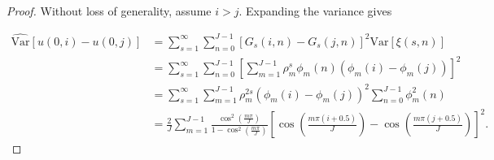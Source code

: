 \documentclass[12pt]{amsart}
\numberwithin{equation}{section}
\newcommand{\1}{\mathbf{1}}
\begin{document}
\begin{proof}
Without loss of generality, assume $i>j$. Expanding the variance gives

\begin{equation}
\begin{split}
\label{var}
    \widehat{\text{Var}}[u(0,i)-u(0,j)]&=\sum_{s=1}^\infty\sum_{n=0}^{J-1}[G_s(i,n)-G_s(j,n)]^2\widehat{\text{Var}}[\xi(s,n)]\\
    &=\sum_{s=1}^\infty\sum_{n=0}^{J-1}\left[\sum_{m=1}^{J-1}\rho_m^s\phi_m(n)\left(\phi_m(i)-\phi_m(j)\right)\right]^2\\
    &=\sum_{s=1}^\infty\sum_{m=1}^{J-1}\rho_m^{2s}\left(\phi_m(i)-\phi_m(j)\right)^2\sum_{n=0}^{J-1}\phi^2_m(n)\\
    &=\frac{2}{J}\sum_{m=1}^{J-1}\frac{\cos^2\left(\frac{m\pi}{J}\right)}{1-\cos^2\left(\frac{m\pi}{J}\right)}\left[\cos\left(\frac{m\pi(i+0.5)}{J}\right)-\cos\left(\frac{m\pi(j+0.5)}{J}\right)\right]^2.
\end{split}
\end{equation}


\end{proof}
\end{document}
